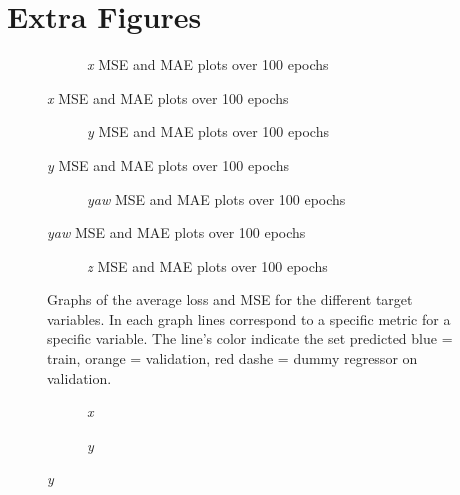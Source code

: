 \chapter{Extra Figures}
\label{Appen:A}
\begin{figure}[h]
	\centering
	\begin{subfigure}[b]{1.1\textwidth}
		\caption{\emph{x} \ac{MSE} and \ac{MAE} plots over 100 epochs}
	\end{subfigure}
\end{figure}
\begin{figure}\ContinuedFloat
	\begin{subfigure}[b]{1.1\textwidth}
		\caption{\emph{y} \ac{MSE} and \ac{MAE} plots over 100 epochs}
		\label{fig:cross_mean_y}
	\end{subfigure}
\end{figure}
\begin{figure}\ContinuedFloat
	\begin{subfigure}[b]{1.1\textwidth}
		\caption{\emph{yaw} \ac{MSE} and \ac{MAE} plots over 100 epochs}
		\label{fig:cross_mean_yaw}
	\end{subfigure}
\end{figure}
\begin{figure}\ContinuedFloat
	\begin{subfigure}[b]{1.1\textwidth}
		\caption{\emph{z} \ac{MSE} and \ac{MAE} plots over 100 epochs}
		\label{fig:cross_mean_z}
	\end{subfigure}
	\caption{Graphs of the average loss and \ac{MSE} for the different target variables. In each graph lines correspond to a specific metric for a specific variable. The line's color indicate the set predicted blue = train, orange = validation, red dashe = dummy regressor on validation.}
	\label{fig:cross_plots}
\end{figure}
\begin{figure}
	\centering
	\begin{subfigure}[b]{1.1\textwidth}
		\caption{\emph{x}}
	\end{subfigure}
	\begin{subfigure}[b]{1.1\textwidth}
		\caption{\emph{y}}
		\label{fig:y_pred100-n}
	\end{subfigure}
\end{figure}
